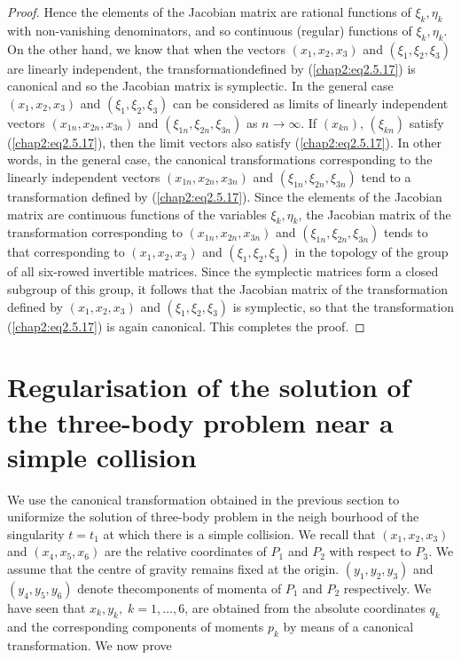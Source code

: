 \begin{proof}
Hence the elements of the Jacobian matrix are rational functions of $\xi_k, \eta_k$ with non-vanishing denominators, and so continuous (regular) functions of $\xi_k, \eta_k$. On the other hand, we know that when the vectors $(x_1, x_2, x_3)$ and $(\xi_1, \xi_2, \xi_3)$ are linearly independent, the transformation\pageoriginale defined by (\ref{chap2:eq2.5.17}) is canonical and so the Jacobian matrix is symplectic. In the general case $(x_1, x_2, x_3)$ and $(\xi_1, \xi_2, \xi_3)$ can be considered as limits of linearly independent vectors $(x_{1n}, x_{2n}, x_{3n})$ and $(\xi_{1n}, \xi_{2n}, \xi_{3n})$ as $n \to \infty$. If $(x_{kn})$, $(\xi_{kn})$ satisfy (\ref{chap2:eq2.5.17}), then the limit vectors also satisfy (\ref{chap2:eq2.5.17}). In other words, in the general case, the canonical transformations corresponding to the linearly independent vectors $(x_{1n}, x_{2n}, x_{3n})$  and $(\xi_{1n}, \xi_{2n}, \xi_{3n})$ tend to a transformation defined by (\ref{chap2:eq2.5.17}). Since the elements of the Jacobian matrix are continuous functions of the variables $\xi_k, \eta_k$, the Jacobian matrix of the transformation corresponding to $(x_{1n}, x_{2n}, x_{3n})$ and $(\xi_{1n}, \xi_{2n}, \xi_{3n})$ tends to that corresponding to $(x_1, x_2, x_3)$ and $(\xi_1, \xi_2, \xi_3)$ in the topology of the group of all six-rowed invertible matrices. Since the symplectic matrices form a closed subgroup of this group, it follows that the Jacobian matrix of the transformation defined by  $(x_1, x_2, x_3)$ and $(\xi_1, \xi_2, \xi_3)$ is symplectic, so that the transformation (\ref{chap2:eq2.5.17}) is again canonical. This completes the proof.
\end{proof}

\section[Regularisation of the solution of the
  three-body...]{Regularisation of the solution of the three-body
  problem near a simple collision}\label{chap2:sec6} 

We use the canonical transformation obtained in the previous section to uniformize the solution of three-body problem in the neigh bourhood of the singularity $t = t_1$ at which there is a simple collision. We recall that $(x_1, x_2, x_3)$ and $(x_4, x_5, x_6)$ are the relative coordinates of $P_1$ and $P_2$ with respect to $P_3$. We assume that the centre of gravity remains fixed at the origin. $(y_1, y_2, y_3)$ and $(y_4, y_5, y_6)$ denote the\pageoriginale components of momenta of $P_1$ and $P_2$ respectively. We have seen that $x_k, y_k, \; k = 1,\ldots, 6$, are obtained from the absolute coordinates $q_k$ and the corresponding components of moments $p_k$ by means of a canonical transformation. We now prove

